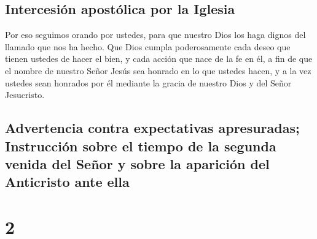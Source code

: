 \hypertarget{intercesiuxf3n-apostuxf3lica-por-la-iglesia}{%
\subsection{Intercesión apostólica por la
Iglesia}\label{intercesiuxf3n-apostuxf3lica-por-la-iglesia}}

 Por eso seguimos orando por ustedes, para que nuestro
Dios los haga dignos del llamado que nos ha hecho. Que Dios cumpla
poderosamente cada deseo que tienen ustedes de hacer el bien, y cada
acción que nace de la fe en él,  a fin de que el nombre
de nuestro Señor Jesús sea honrado en lo que ustedes hacen, y a la vez
ustedes sean honrados por él mediante la gracia de nuestro Dios y del
Señor Jesucristo.

\hypertarget{advertencia-contra-expectativas-apresuradas-instrucciuxf3n-sobre-el-tiempo-de-la-segunda-venida-del-seuxf1or-y-sobre-la-apariciuxf3n-del-anticristo-ante-ella}{%
\subsection{Advertencia contra expectativas apresuradas; Instrucción
sobre el tiempo de la segunda venida del Señor y sobre la aparición del
Anticristo ante
ella}\label{advertencia-contra-expectativas-apresuradas-instrucciuxf3n-sobre-el-tiempo-de-la-segunda-venida-del-seuxf1or-y-sobre-la-apariciuxf3n-del-anticristo-ante-ella}}

\hypertarget{section-1}{%
\section{2}\label{section-1}}


